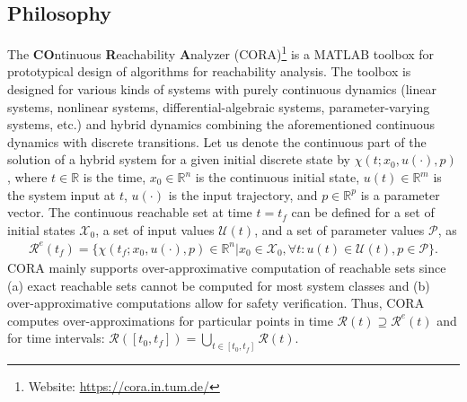 \subsection{Philosophy}

The \textbf{CO}ntinuous \textbf{R}eachability \textbf{A}nalyzer (CORA)\footnote{Website: \url{https://cora.in.tum.de/}} is a MATLAB toolbox for prototypical design of algorithms for reachability analysis. The toolbox is designed for various kinds of systems with purely continuous dynamics (linear systems, nonlinear systems, differential-algebraic systems, parameter-varying systems, etc.) and hybrid dynamics combining the aforementioned continuous dynamics with discrete transitions.
Let us denote the continuous part of the solution of a hybrid system for a given initial discrete state by $\chi(t;x_0,u(\cdot),p)$, where $t\in\mathbb{R}$ is the time, $x_0 \in \mathbb{R}^n$ is the continuous initial state, $u(t) \in \mathbb{R}^m$ is the system input at $t$, $u(\cdot)$ is the input trajectory, and $p\in \mathbb{R}^p$ is a parameter vector. The continuous reachable set at time $t=t_f$ can be defined for a set of initial states $\mathcal{X}_0$, a set of input values $\mathcal{U}(t)$, and a set of parameter values $\mathcal{P}$, as
\begin{gather*}
  \mathcal{R}^e(t_f) = \Big\{ \chi(t_f;x_0,u(\cdot),p) \in \mathbb{R}^n \big| x_0 \in \mathcal{X}_0, \forall t: u(t)\in\mathcal{U}(t), p \in \mathcal{P} \Big\}.
\end{gather*}
CORA mainly supports over-approximative computation of reachable sets since (a) exact reachable sets cannot be computed for most system classes \cite{Lafferriere2001} and (b) over-approximative computations allow for safety verification. Thus, CORA computes over-approximations for particular points in time $\mathcal{R}(t) \supseteq \mathcal{R}^e(t)$ and for time intervals: $\mathcal{R}([t_0,t_f]) = \bigcup_{t\in [t_0,t_f]} \mathcal{R}(t)$. 


